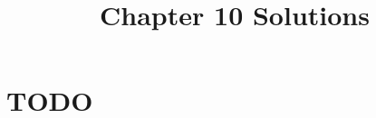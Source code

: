 \documentclass[12pt]{article}
\title{Chapter 10 Solutions}
\begin{document}
\section{TODO}
\end{document}
